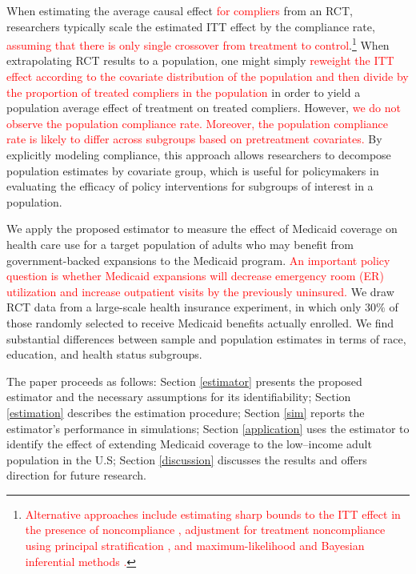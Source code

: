 \documentclass[hidelinks,12pt]{article}
\begin{document}
When estimating the average causal effect \textcolor{red}{for compliers} from an RCT, researchers typically scale the estimated ITT effect by the compliance rate, \textcolor{red}{assuming that there is only single crossover from treatment to control}.\footnote{\textcolor{red}{Alternative approaches include estimating sharp bounds to the ITT effect in the presence of noncompliance \citep{balke1997bounds,imai2013experimental}, adjustment for treatment noncompliance using principal stratification \citep{frangakis2002principal,frumento2012evaluating}, and maximum-likelihood and Bayesian inferential methods \citep{yau2001inference}.}} When extrapolating RCT results to a population, one might simply \textcolor{red}{reweight the ITT effect according to the covariate distribution of the population and then divide by the proportion of treated compliers in the population} in order to yield a population average effect of treatment on treated compliers. However, \textcolor{red}{we do not observe the population compliance rate. Moreover, the population compliance rate is likely to differ across subgroups based on pretreatment covariates.} By explicitly modeling compliance, this approach allows researchers to decompose population estimates by covariate group, which is useful for policymakers in evaluating the efficacy of policy interventions for subgroups of interest in a population. 

We apply the proposed estimator to measure the effect of Medicaid coverage on health care use for a target population of adults who may benefit from government-backed expansions to the Medicaid program. \textcolor{red}{An important policy question is whether Medicaid expansions will decrease emergency room (ER) utilization and increase outpatient visits by the previously uninsured.} We draw RCT data from a large-scale health insurance experiment, in which only $30\%$ of those randomly selected to receive Medicaid benefits actually enrolled. We find substantial differences between sample and population estimates in terms of race, education, and health status subgroups.

The paper proceeds as follows: Section \ref{estimator} presents the proposed estimator and the necessary assumptions for its identifiability; Section \ref{estimation} describes the estimation procedure; Section \ref{sim} reports the estimator's performance in simulations; Section \ref{application} uses the estimator to identify the effect of extending Medicaid coverage to the low--income adult population in the U.S; Section \ref{discussion} discusses the results and offers direction for future research. 
\end{document}
